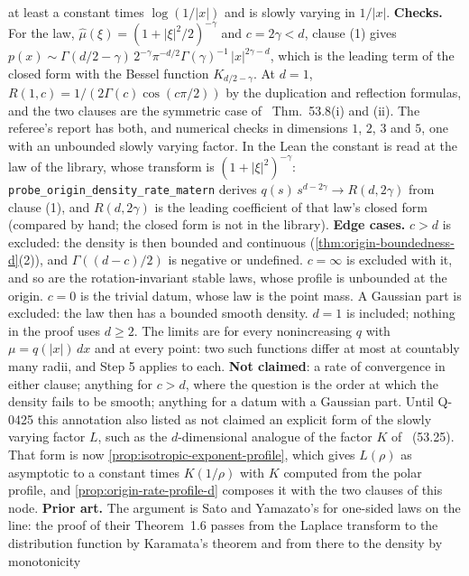 \begin{proposition}
{at least a constant times $\log(1/|x|)$ and is slowly varying in $1/|x|$. \textbf{Checks.} For the
\Matern{} law, $\widehat\mu(\xi) = (1 + |\xi|^2/2)^{-\gamma}$ and $c = 2\gamma < d$, clause (1)
gives $p(x) \sim \Gamma(d/2 - \gamma)\,2^{-\gamma}\pi^{-d/2}\Gamma(\gamma)^{-1}\,|x|^{2\gamma - d}$,
which is the leading term of the closed form with the Bessel function $K_{d/2-\gamma}$. At $d = 1$,
$R(1,c) = 1/(2\Gamma(c)\cos(c\pi/2))$ by the duplication and reflection formulas, and the two
clauses are the symmetric case of ~Thm.~53.8(i) and (ii). The referee's
report has both, and numerical checks in dimensions $1$, $2$, $3$ and $5$, one with an unbounded
slowly varying factor. In the Lean the constant is read at the \Matern{} law of the library,
whose transform is $(1 + |\xi|^2)^{-\gamma}$: \texttt{probe\_origin\_density\_rate\_matern} derives
$q(s)\,s^{d-2\gamma} \to R(d,2\gamma)$ from clause (1), and $R(d,2\gamma)$ is the leading
coefficient of that law's closed form (compared by hand; the closed form is not in the library).
\textbf{Edge cases.} $c > d$ is excluded: the density is then bounded and
continuous (\ref{thm:origin-boundedness-d}(2)), and $\Gamma((d-c)/2)$ is negative or undefined.
$c = \infty$ is excluded with it, and so are the rotation-invariant stable laws, whose profile is
unbounded at the origin. $c = 0$ is the trivial datum, whose law is the point mass. A Gaussian
part is excluded: the law then has a bounded smooth density. $d = 1$ is included; nothing in the
proof uses $d \ge 2$. The limits are for every nonincreasing $q$ with $\mu = q(|x|)\,dx$ and at
every point: two such functions differ at most at countably many radii, and Step 5 applies to
each. \textbf{Not claimed}: a rate of convergence in either clause; anything for
$c > d$, where the question is the order at which the density fails to be smooth; anything for a
datum with a Gaussian part. Until Q-0425 this annotation also listed as not claimed an explicit
form of the slowly varying factor $L$, such as the $d$-dimensional analogue of the factor $K$ of
~(53.25). That form is now \ref{prop:isotropic-exponent-profile}, which
gives $L(\rho)$ as asymptotic to a constant times $K(1/\rho)$ with $K$ computed from the polar
profile, and \ref{prop:origin-rate-profile-d} composes it with the two clauses of this node.
\textbf{Prior art.} The argument is Sato and Yamazato's for one-sided
laws on the line: the proof of their Theorem~1.6 passes from the Laplace transform to the
distribution function by Karamata's theorem and from there to the density by monotonicity
}
\end{proposition}
